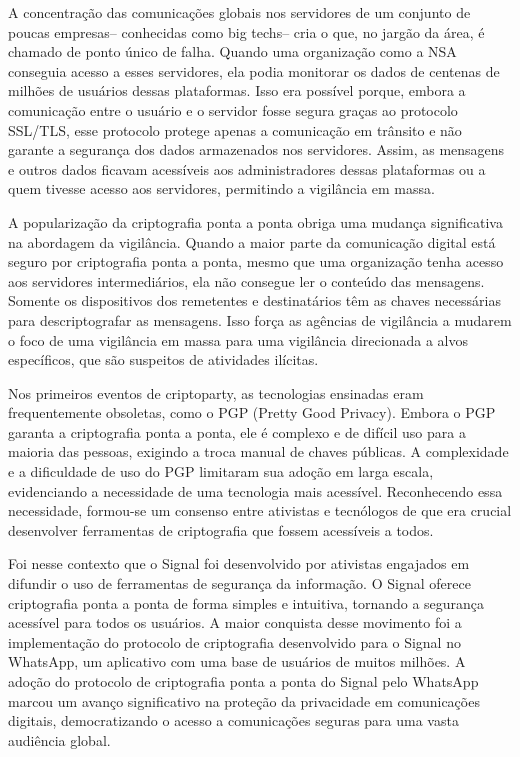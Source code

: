 A concentração das comunicações globais nos servidores de um conjunto de poucas empresas-- conhecidas como big techs-- cria o que, no jargão da área, é chamado de ponto único de falha.
Quando uma organização como a NSA conseguia acesso a esses servidores, ela podia monitorar os dados de centenas de milhões de usuários dessas plataformas.
Isso era possível porque, embora a comunicação entre o usuário e o servidor fosse segura graças ao protocolo SSL/TLS, esse protocolo protege apenas a comunicação em trânsito e não garante a segurança dos dados armazenados nos servidores.
Assim, as mensagens e outros dados ficavam acessíveis aos administradores dessas plataformas ou a quem tivesse acesso aos servidores, permitindo a vigilância em massa.

A popularização da criptografia ponta a ponta obriga uma mudança significativa na abordagem da vigilância.
Quando a maior parte da comunicação digital está seguro por criptografia ponta a ponta, mesmo que uma organização tenha acesso aos servidores intermediários, ela não consegue ler o conteúdo das mensagens.
Somente os dispositivos dos remetentes e destinatários têm as chaves necessárias para descriptografar as mensagens.
Isso força as agências de vigilância a mudarem o foco de uma vigilância em massa para uma vigilância direcionada a alvos específicos, que são suspeitos de atividades ilícitas.

Nos primeiros eventos de criptoparty, as tecnologias ensinadas eram frequentemente obsoletas, como o PGP (Pretty Good Privacy).
Embora o PGP garanta a criptografia ponta a ponta, ele é complexo e de difícil uso para a maioria das pessoas, exigindo a troca manual de chaves públicas.
A complexidade e a dificuldade de uso do PGP limitaram sua adoção em larga escala, evidenciando a necessidade de uma tecnologia mais acessível.
Reconhecendo essa necessidade, formou-se um consenso entre ativistas e tecnólogos de que era crucial desenvolver ferramentas de criptografia que fossem acessíveis a todos.

Foi nesse contexto que o Signal foi desenvolvido por ativistas engajados em difundir o uso de ferramentas de segurança da informação.
O Signal oferece criptografia ponta a ponta de forma simples e intuitiva, tornando a segurança acessível para todos os usuários.
A maior conquista desse movimento foi a implementação do protocolo de criptografia desenvolvido para o Signal no WhatsApp, um aplicativo com uma base de usuários de muitos milhões.
A adoção do protocolo de criptografia ponta a ponta do Signal pelo WhatsApp marcou um avanço significativo na proteção da privacidade em comunicações digitais, democratizando o acesso a comunicações seguras para uma vasta audiência global.

